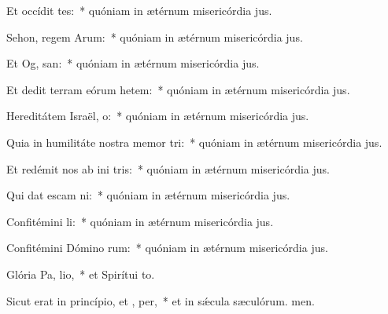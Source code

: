 \item Et occídit  tes:~* quóniam in ætérnum misericórdia jus.
\item Sehon, regem Arum:~* quóniam in ætérnum misericórdia jus.
\item Et Og,  san:~* quóniam in ætérnum misericórdia jus.
\item Et dedit terram eórum hetem:~* quóniam in ætérnum misericórdia jus.
\item Hereditátem Israël,  o:~* quóniam in ætérnum misericórdia jus.
\item Quia in humilitáte nostra memor  tri:~* quóniam in ætérnum misericórdia jus.
\item Et redémit nos ab ini tris:~* quóniam in ætérnum misericórdia jus.
\item Qui dat escam  ni:~* quóniam in ætérnum misericórdia jus.
\item Confitémini  li:~* quóniam in ætérnum misericórdia jus.
\item Confitémini Dómino rum:~* quóniam in ætérnum misericórdia jus.
\item Glória Pa,  lio,~* et Spirítui to.
\item Sicut erat in princípio, et ,  per,~* et in sǽcula sæculórum. men.
